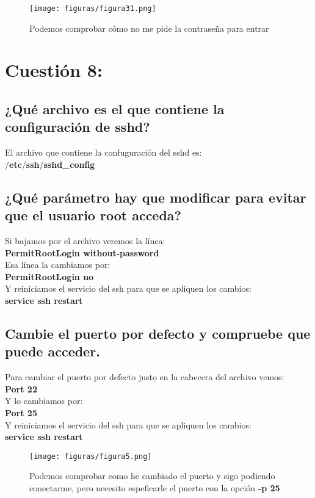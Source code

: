\begin{figure}[H] %
	\centering
	\texttt{[image: figuras/figura31.png]}  %
	\label{figura31}
	
	\caption{Podemos comprobar cómo no me pide la contraseña para entrar} 
\end{figure}

\section{Cuestión 8:   }
\subsection{¿Qué archivo es el que contiene la configuración de sshd?}
El archivo que contiene la confuguración del sshd es:\\
\textbf{$/$etc$/$ssh$/$sshd\_config}
\subsection{¿Qué parámetro hay que modificar para evitar que el usuario root acceda?}
Si bajamos por el archivo veremos la línea:\\
\textbf{PermitRootLogin without-password}\\
Esa línea la cambiamos por:\\
\textbf{PermitRootLogin no}\\
Y reiniciamos el servicio del ssh para que se apliquen los cambios:\\
\textbf{service ssh restart}
\subsection{Cambie el puerto por defecto y compruebe que puede acceder.}
Para cambiar el puerto por defecto justo en la cabecera del archivo vemos:\\
\textbf{Port 22}\\
Y lo cambiamos por:\\
\textbf{Port 25}\\
Y reiniciamos el servicio del ssh para que se apliquen los cambios:\\
\textbf{service ssh restart}

\begin{figure}[H] %
	\centering
	\texttt{[image: figuras/figura5.png]}  %
	\label{figura5}
	
	\caption{Podemos comprobar como he cambiado el puerto y sigo podiendo conectarme, pero necesito espeficarle el puerto con la opción \textbf{-p 25}} 
\end{figure}

